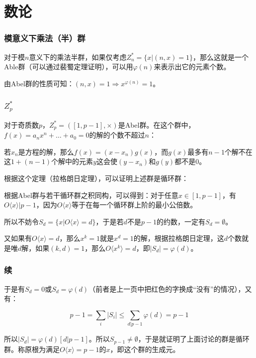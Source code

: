 \documentclass[10pt]{beamer}
\begin{document}
	\section{数论}
	\begin{frame}
		\frametitle{模意义下乘法（半）群}
	
		对于模$n$意义下的乘法半群，如果仅考虑$Z_n^*=\{x|(n,x)=1\}$，那么这就是一个Able群（可以通过裴蜀定理证明），可以用$\varphi(n)$来表示出它的元素个数。

		由Abel群的性质可知：$(n,x)=1\Rightarrow x^{\varphi(n)}=1$。
	
	\end{frame}
	\begin{frame}
		\frametitle{$Z_p^*$}
	
		对于奇质数$p$，$Z_p^*=([1,p-1],\times)$是Abel群。在这个群中，$f(x)=a_nx^n+\dots+a_0=0$的解的个数不超过$n$：

		若$x_n$是方程的解，那么$f(x)=(x-x_n)g(x)$，而$g(x)$最多有$n-1$个解不在这$1+(n-1)$个解中的元素$y$这会使$(y-x_n)$和$g(y)$都不是$0$。

		根据这个定理（拉格朗日定理），可以证明上述群是循环群：

		根据Abel群与若干循环群之积同构，可以得到：对于任意$x\in[1,p-1]$，有$O\langle x\rangle|p-1$，因为$O\langle x\rangle$等于在每一个循环群上阶的最小公倍数。

		所以不妨令$S_d=\{x|O\langle x\rangle=d\}$，于是若$d$不是$p-1$的约数，一定有$S_d=\emptyset$。

		又如果{\color{red}有}$O\langle x\rangle=d$，那么$x^{k}=1$就是$x^d=1$的解，根据拉格朗日定理，这$d$个数就是唯$d$解，如果$(k,d)=1$，那么$O\langle x^k\rangle=d$，即$|S_d|=\varphi(d)$。
	
	\end{frame}
	\begin{frame}
		\frametitle{续}
	
		于是有$S_d=0$或$S_d=\varphi(d)$（前者是上一页中把红色的字换成“没有”的情况），又有：

		$$
		p-1=\sum_i |S_i|\le \sum_{d|p-1} \varphi(d)=p-1
		$$

		所以$|S_d|=\varphi(d)[d|p-1]$。所以$S_{p-1}\not=\emptyset$，于是就证明了上面讨论的群是循环群。称原根为满足$O\langle x\rangle=p-1$的$x$，即这个群的生成元。
	
	\end{frame}
\end{document}
